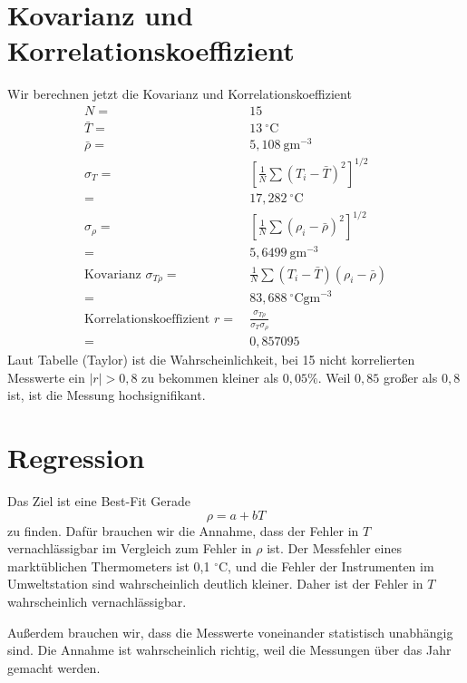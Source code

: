 \documentclass[prb,12pt]{revtex4-2}
\theoremstyle{definition}
\theoremstyle{definition}
\begin{document}
\section{Kovarianz und Korrelationskoeffizient}
Wir berechnen jetzt die Kovarianz und Korrelationskoeffizient
\begin{align*}
	N=&~15\\
	\bar{T}=&~13~{}^{\circ}\text{C}\\
	\bar{\rho}=&~5,108~\text{gm}^{-3}\\
	\sigma_T=&~\left[\frac 1N\sum (T_i-\bar{T})^2\right]^{1/2}\\
	=&~17,282~{}^{\circ}\text{C}\\
	\sigma_\rho=&~\left[\frac 1N\sum (\rho_i-\bar{\rho})^2\right]^{1/2}\\
	=&~5,6499~\text{gm}^{-3}\\
	\text{Kovarianz }\sigma_{T\rho}=&~\frac 1N \sum (T_i-\bar{T})(\rho_i - \bar{\rho})\\
	=&~83,688~{}^{\circ}\text{Cgm}^{-3}\\
	\text{Korrelationskoeffizient }r=&~\frac{\sigma_{T\rho}}{\sigma_T\sigma_\rho}\\
	=&~0,857095
\end{align*}
Laut Tabelle (Taylor) ist die Wahrscheinlichkeit, bei 15 nicht korrelierten Messwerte ein $|r|>0,8$ zu bekommen kleiner als $0,05\%$. Weil $0,85$ großer als $0,8$ ist, ist die Messung hochsignifikant.
\section{Regression}
Das Ziel ist eine Best-Fit Gerade
\[\rho = a+ bT\]
zu finden. Dafür brauchen wir die Annahme, dass der Fehler in $T$ vernachlässigbar im Vergleich zum Fehler in $\rho$ ist. Der Messfehler eines marktüblichen Thermometers ist 0,1 $^\circ$C, und die Fehler der Instrumenten im Umweltstation sind wahrscheinlich deutlich kleiner. Daher ist der Fehler in $T$ wahrscheinlich vernachlässigbar.

Außerdem brauchen wir, dass die Messwerte voneinander statistisch unabhängig sind. Die Annahme ist wahrscheinlich richtig, weil die Messungen über das Jahr gemacht werden.
\end{document}
